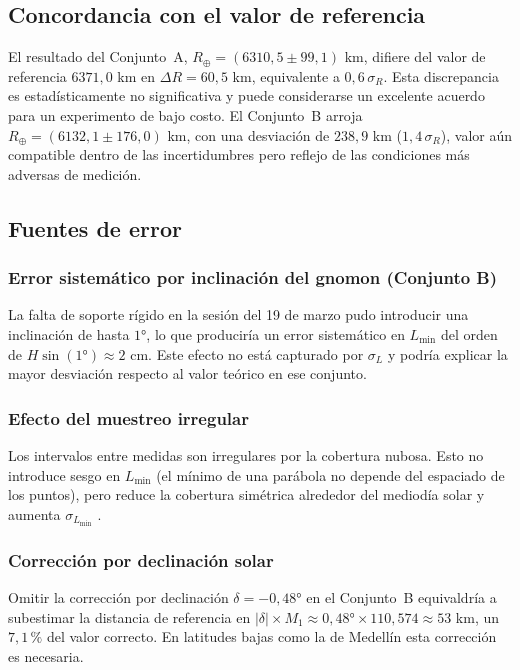 \documentclass[stu,12pt,floatsintext]{apa7}
\begin{document}
\subsection{Concordancia con el valor de referencia}

El resultado del Conjunto~A, $R_\oplus = (6310{,}5 \pm 99{,}1)$ km, difiere del valor
de referencia $6371{,}0$ km en $\Delta R = 60{,}5$ km, equivalente a $0{,}6\,\sigma_R$.
Esta discrepancia es estadísticamente no significativa y puede considerarse un excelente
acuerdo para un experimento de bajo costo. El Conjunto~B arroja $R_\oplus = (6132{,}1 \pm 176{,}0)$ km,
con una desviación de $238{,}9$ km ($1{,}4\,\sigma_R$), valor aún compatible dentro de las
incertidumbres pero reflejo de las condiciones más adversas de medición.

\subsection{Fuentes de error}

\subsubsection*{Error sistemático por inclinación del gnomon (Conjunto B)}

La falta de soporte rígido en la sesión del 19 de marzo pudo introducir una inclinación
de hasta $1°$, lo que produciría un error sistemático en $L_{\min}$ del orden de
$H\sin(1°) \approx 2$ cm. Este efecto no está capturado por $\sigma_L$ y podría
explicar la mayor desviación respecto al valor teórico en ese conjunto.

\subsubsection*{Efecto del muestreo irregular}

Los intervalos entre medidas son irregulares por la cobertura nubosa. Esto no introduce
sesgo en $L_{\min}$ (el mínimo de una parábola no depende del espaciado de los puntos),
pero reduce la cobertura simétrica alrededor del mediodía solar y aumenta
$\sigma_{L_{\min}}$ \parencite{baird1991experimentacion}.

\subsubsection*{Corrección por declinación solar}

Omitir la corrección por declinación $\delta = -0{,}48°$ en el Conjunto~B equivaldría
a subestimar la distancia de referencia en
$|\delta| \times M_1 \approx 0{,}48° \times 110{,}574 \approx 53$ km, un $7{,}1\,\%$
del valor correcto. En latitudes bajas como la de Medellín esta corrección es necesaria.
\end{document}
